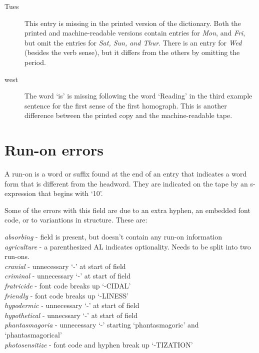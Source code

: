 \begin{description}
\item [Tues] This entry is missing in the printed version of the dictionary.  Both the printed
and machine-readable versions contain entries for  {\it Mon}, and {\it Fri}, but omit the entries
for {\it Sat, Sun, and  Thur}.  There is an entry for {\it Wed} (besides the verb sense), but it
differs from the others by omitting the period.  


\item [west] The word `is' is missing following the word `Reading' in the third example sentence
for the first sense of the first homograph.  This is another
difference between the printed copy and the machine-readable tape.


\end{description}








\section{Run-on errors}
A run-on is a word or suffix found at the end of an entry that indicates a
word form that is different from the headword.  They are indicated on the tape 
by an s-expression that begins with `10'.  

Some of the errors with this field are due to an extra hyphen, an embedded font code, or
to variantions in structure.  These are:

\smallskip

\noindent
{\it absorbing}      - field is present, but doesn't contain any run-on information \\
{\it agriculture}    - a parenthesized AL indicates optionality.  Needs to be split into two run-ons. \\
{\it cranial}        - unnecessary `-' at start of field \\
{\it criminal}       - unnecessary `-' at start of field \\
{\it fratricide}     - font code breaks up `-CIDAL' \\
{\it friendly}       - font code breaks up `-LINESS' \\
{\it hypodermic}     - unnecessary `-' at start of field \\
{\it hypothetical}   - unnecssary `-' at start of field \\
{\it phantasmagoria} - unnecessary `-' starting `phantasmagoric' and `phantasmagorical' \\
{\it photosensitize} - font code and hyphen break up `-TIZATION' \\


